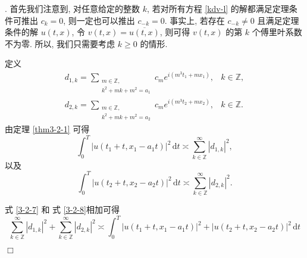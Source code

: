 \documentclass[master]{cugthesis}
\newcommand\Z{\ensuremath{\mathbb{Z}}}
\renewcommand\d{\ensuremath{\,\mathrm{d}}}
\newenvironment{proof}{{\noindent\itshape 证明}.}{\hfill $\Box$\par}
\begin{document}
    \begin{proof}
    首先我们注意到, 对任意给定的整数 $k$, 若对所有方程 \eqref{kdv-l} 的解都满足定理条件可推出 $c_k=0$, 则一定也可以推出 $c_{-k}=0$. 事实上, 若存在 $c_{-k}\neq 0$ 且满足定理条件的解 $u(t,x)$, 令 $v(t,x)=\overline{u(t,x)}$, 则可得 $v(t,x)$ 的第 $k$ 个傅里叶系数不为零.
    所以, 我们只需要考虑 $k\ge 0$ 的情形.
    
    定义
    \begin{equation*}
        \begin{array}{ll}
                        d_{1,k}=\sum\limits_{\substack{
                m\in \Z,  \\
                k^2+mk+m^2 = a_1 }} 
             c_me^{i(m^3t_1+mx_1)}, & k\in \Z, \\
                        d_{2,k}=\sum\limits_{\substack{
                m\in \Z,  \\
                k^2+mk+m^2 = a_2 }} 
             c_me^{i(m^3t_2+mx_2)}, & k\in \Z. 
        \end{array}
    \end{equation*}
    由定理 \ref{thm3-2-1} 可得
\begin{equation}\label{3-2-7}
    \int_0^T |u(t_1+t,x_1-a_1t)|^2\d t\asymp \sum_{k\in\Z}^\infty|d_{1,k}|^2,
\end{equation}
以及
\begin{equation}\label{3-2-8}
    \int_0^T |u(t_2+t,x_2-a_2t)|^2\d t\asymp \sum_{k\in\Z}^\infty|d_{2,k}|^2.
\end{equation}

式 \eqref{3-2-7} 和 式 \eqref{3-2-8}相加可得
\begin{equation}\label{3-2-9}
  \sum_{k\in\Z}^\infty|d_{1,k}|^2+\sum_{k\in\Z}^\infty|d_{2,k}|^2\asymp \int_0^T |u(t_1+t,x_1-a_1t)|^2 + |u(t_2+t,x_2-a_2t)|^2\d t
\end{equation}
    

\end{proof}
\end{document}
